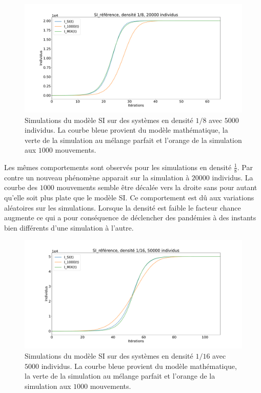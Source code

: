 \begin{figure}[h]
	\centering
	\captionsetup{justification=centering}
	\includegraphics[width=1\textwidth]{Images/SI_ref_8_20k.pdf}
	\caption[Simulations de SI, densité 1/8]{Simulations du modèle SI sur des systèmes en densité $1/8$ avec $5000$ individus. La courbe bleue provient du modèle mathématique, la verte de la simulation au mélange parfait et l'orange de la simulation aux $1000$ mouvements.}
\end{figure}

Les mêmes comportements sont observés pour les simulations en densité $\frac{1}{8}$. Par contre un nouveau phénomène apparait sur la simulation à $20000$ individus. La courbe des $1000$ mouvements semble être décalée vers la droite sans pour autant qu'elle soit plus plate que le modèle SI. Ce comportement est dû aux variations aléatoires sur les simulations. Lorsque la densité est faible le facteur chance augmente ce qui a pour conséquence de déclencher des pandémies à des instants bien différents d'une simulation à l'autre.

\begin{figure}[h]
	\centering
	\captionsetup{justification=centering}
	\includegraphics[width=1\textwidth]{Images/SI_ref_16_50k.pdf}
	\caption[Simulations de SI, densité 1/16]{Simulations du modèle SI sur des systèmes en densité $1/16$ avec $5000$ individus. La courbe bleue provient du modèle mathématique, la verte de la simulation au mélange parfait et l'orange de la simulation aux $1000$ mouvements.}
\end{figure}

